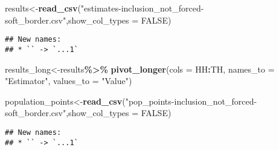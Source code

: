 \documentclass[
]{article}
\newenvironment{Shaded}{\begin{snugshade}}{\end{snugshade}}
\newcommand{\AttributeTok}[1]{\textcolor[rgb]{0.13,0.29,0.53}{#1}}
\newcommand{\ConstantTok}[1]{\textcolor[rgb]{0.56,0.35,0.01}{#1}}
\newcommand{\FunctionTok}[1]{\textcolor[rgb]{0.13,0.29,0.53}{\textbf{#1}}}
\newcommand{\NormalTok}[1]{#1}
\newcommand{\OtherTok}[1]{\textcolor[rgb]{0.56,0.35,0.01}{#1}}
\newcommand{\SpecialCharTok}[1]{\textcolor[rgb]{0.81,0.36,0.00}{\textbf{#1}}}
\newcommand{\StringTok}[1]{\textcolor[rgb]{0.31,0.60,0.02}{#1}}
\begin{document}
\begin{Shaded}
\begin{Highlighting}[]
\NormalTok{results}\OtherTok{\textless{}{-}}\FunctionTok{read\_csv}\NormalTok{(}\StringTok{"estimates{-}inclusion\_not\_forced{-}soft\_border.csv"}\NormalTok{,}\AttributeTok{show\_col\_types =} \ConstantTok{FALSE}\NormalTok{)}
\end{Highlighting}
\end{Shaded}

\begin{verbatim}
## New names:
## * `` -> `...1`
\end{verbatim}

\begin{Shaded}
\begin{Highlighting}[]
\NormalTok{results\_long}\OtherTok{\textless{}{-}}\NormalTok{results}\SpecialCharTok{\%\textgreater{}\%}
  \FunctionTok{pivot\_longer}\NormalTok{(}\AttributeTok{cols =}\NormalTok{ HH}\SpecialCharTok{:}\NormalTok{TH,}
               \AttributeTok{names\_to =} \StringTok{"Estimator"}\NormalTok{, }
               \AttributeTok{values\_to =} \StringTok{"Value"}\NormalTok{)}

\NormalTok{population\_points}\OtherTok{\textless{}{-}}\FunctionTok{read\_csv}\NormalTok{(}\StringTok{"pop\_points{-}inclusion\_not\_forced{-}soft\_border.csv"}\NormalTok{,}\AttributeTok{show\_col\_types =} \ConstantTok{FALSE}\NormalTok{)}
\end{Highlighting}
\end{Shaded}

\begin{verbatim}
## New names:
## * `` -> `...1`
\end{verbatim}
\end{document}

